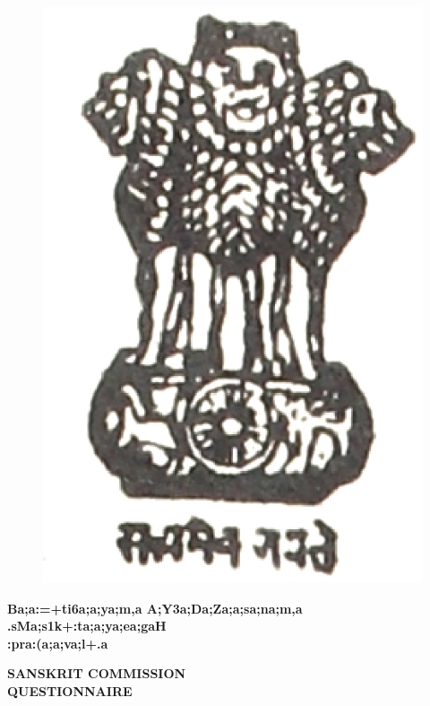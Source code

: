 \newpage

\begin{figure}[h]
\centering
{\includegraphics[scale=.25]{0345.eps}}
\end{figure}

\begin{center}
{\large\bfseries{\sktf Ba;a:=+ti6a;a;ya;m,a A;Y3a;Da;Za;a;sa;na;m,a}}\\[10pt]
{\Large\bfseries{\sktf .sMa;s1k+:ta;a;ya;ea;gaH}}%
\\[30pt]
{\Huge\bfseries{\sktf :pra:(a;a;va;l+.a}}
\end{center}


\vskip 3cm

{\rm 
\begin{center}
{\large\bfseries{SANSKRIT COMMISSION}}\\[30pt]
{\large\bfseries{QUESTIONNAIRE}}
\end{center}
}

